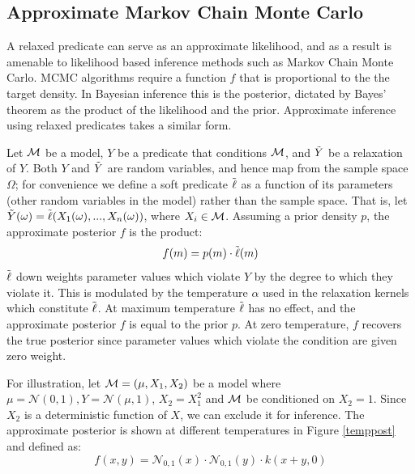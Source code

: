 \subsection{Approximate Markov Chain Monte Carlo}
A relaxed predicate can serve as an approximate likelihood, and as a result is amenable to likelihood based inference methods such as Markov Chain Monte Carlo.
MCMC algorithms require a function $f$ that is proportional to the the target density.
In Bayesian inference this is the posterior, dictated by Bayes' theorem as the product of the likelihood and the prior.
Approximate inference using relaxed predicates takes a similar form.

Let ${\mathcal{M}}$ be a model, $Y$ be a predicate that conditions ${\mathcal{M}}$, and $\tilde{Y}$ be a relaxation of $Y$.
Both $Y$ and $\tilde{Y}$ are random variables, and hence map from the sample space $\Omega$;
for convenience we define a soft predicate $\tilde{\operatorname{\ell}}$ as a function of its parameters (other random variables in the model) rather than the sample space.
That is, let $\tilde{Y}(\omega) = \tilde{\operatorname{\ell}}(X_1(\omega), ..., X_n(\omega))$, where $X_i \in {\mathcal{M}}$.
Assuming a prior density $p$, the approximate posterior $f$ is the product:
\begin{equation}
f(m) = p(m) \cdot \tilde{\operatorname{\ell}}(m)
\end{equation}
$\tilde{\operatorname{\ell}}$ down weights parameter values which violate $Y$ by the degree to which they violate it. 
This is modulated by the temperature $\alpha$ used in the  relaxation kernels which constitute $\tilde{\operatorname{\ell}}$.
At maximum temperature $\tilde{\operatorname{\ell}}$ has no effect, and the approximate posterior $f$ is equal to the prior $p$.
At zero temperature, $f$ recovers the true posterior since parameter values which violate the condition are given zero weight.

For illustration, let ${\mathcal{M}} = (\mu, X_1, X_2)$ be a model where $\mu = \mathcal{N}(0, 1), Y = \mathcal{N}(\mu, 1)$, $X_2 = X_1^2$ and ${\mathcal{M}}$ be conditioned on $X_2 = 1$.
Since $X_2$ is a deterministic function of $X$, we can exclude it for inference.
The approximate posterior is shown at different temperatures in Figure \ref{temppost} and defined as:
\begin{equation}\label{approxposterior}
f(x, y) = \mathcal{N}_{0,1}(x) \cdot \mathcal{N}_{0,1}(y) \cdot k(x + y, 0) 
\end{equation}

